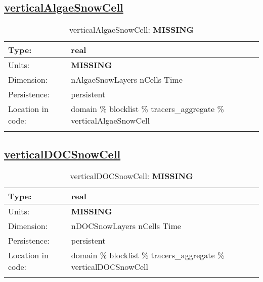 \subsection[verticalAlgaeSnowCell]{\hyperref[sec:var_tab_tracers_aggregate]{verticalAlgaeSnowCell}}
\label{subsec:var_sec_tracers_aggregate_verticalAlgaeSnowCell}
\begin{center}
\begin{longtable}{| p{2.0in} | p{4.0in} |}
        \hline 
        Type: & real \\
        \hline 
        Units: & {\bf \color{red} MISSING} \\
        \hline 
        Dimension: & nAlgaeSnowLayers nCells Time \\
        \hline 
        Persistence: & persistent \\
        \hline 
         Location in code: & domain \% blocklist \% tracers\_aggregate \% verticalAlgaeSnowCell \\
         \hline 
    \caption{verticalAlgaeSnowCell: {\bf \color{red} MISSING}}
\end{longtable}
\end{center}
\subsection[verticalDOCSnowCell]{\hyperref[sec:var_tab_tracers_aggregate]{verticalDOCSnowCell}}
\label{subsec:var_sec_tracers_aggregate_verticalDOCSnowCell}
\begin{center}
\begin{longtable}{| p{2.0in} | p{4.0in} |}
        \hline 
        Type: & real \\
        \hline 
        Units: & {\bf \color{red} MISSING} \\
        \hline 
        Dimension: & nDOCSnowLayers nCells Time \\
        \hline 
        Persistence: & persistent \\
        \hline 
         Location in code: & domain \% blocklist \% tracers\_aggregate \% verticalDOCSnowCell \\
         \hline 
    \caption{verticalDOCSnowCell: {\bf \color{red} MISSING}}
\end{longtable}
\end{center}
